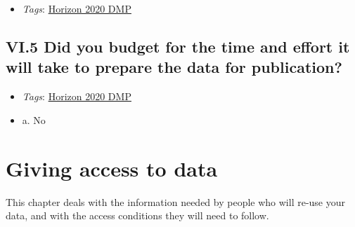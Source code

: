 \documentclass[a4paper,12pt]{report}
\begin{document}
\label{d5b27482-b598-4b8c-b534-417d4ad27394.de23bb94-b727-4907-9a5d-6f8c78c3e432.fe8ed36b-40e8-483b-ab31-061f6168d7ad.edc9b6d9-c121-4e00-ba83-710330c2e18d.6fb69263-d2cb-4d90-babe-523136c29bc4.6e0704a2-cea3-4ae7-8ab5-5eb6db163639}


\begin{itemize}
  \item \textit{Tags}: \ul{Horizon 2020 DMP}
  \end{itemize}






\section*{\protect\textcolor{colorSecId}{VI.5} Did you budget for the time and effort it will take to prepare the data for publication?}

\label{d5b27482-b598-4b8c-b534-417d4ad27394.13a7eeae-09f5-42bf-8e62-b2c1fe1b86f7}


\begin{itemize}
  \item \textit{Tags}: \ul{Horizon 2020 DMP}
  \end{itemize}




\begin{itemize}
  \item[\CheckmarkBold] a. No
\end{itemize}








\chapter{Giving access to data}
\label{6be88f7c-f868-460f-bba7-91e1c659adfd}
\begin{markdown}
This chapter deals with the information needed by people who will re-use your data, and with the access conditions they will need to follow.
\end{markdown}
\end{document}
